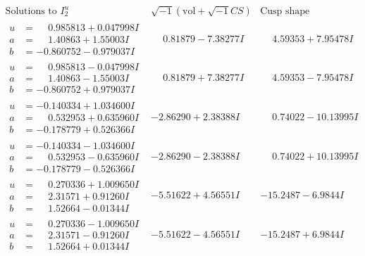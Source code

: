 \documentclass[1p]{elsarticle_modified}
\theoremstyle{definition}
\newcommand{\I}{\sqrt{-1}}
\begin{document}
$$\begin{array}{c|c|c}  
\text{Solutions to }I^u_{2}& \I (\text{vol} + \sqrt{-1}CS) & \text{Cusp shape}\\
 \hline 
\begin{aligned}
u &= \phantom{-}0.985813 + 0.047998 I \\
a &= \phantom{-}1.40863 + 1.55003 I \\
b &= -0.860752 - 0.979037 I\end{aligned}
 & \phantom{-}0.81879 - 7.38277 I & \phantom{-}4.59353 + 7.95478 I \\ \hline\begin{aligned}
u &= \phantom{-}0.985813 - 0.047998 I \\
a &= \phantom{-}1.40863 - 1.55003 I \\
b &= -0.860752 + 0.979037 I\end{aligned}
 & \phantom{-}0.81879 + 7.38277 I & \phantom{-}4.59353 - 7.95478 I \\ \hline\begin{aligned}
u &= -0.140334 + 1.034600 I \\
a &= \phantom{-}0.532953 + 0.635960 I \\
b &= -0.178779 + 0.526366 I\end{aligned}
 & -2.86290 + 2.38388 I & \phantom{-}0.74022 - 10.13995 I \\ \hline\begin{aligned}
u &= -0.140334 - 1.034600 I \\
a &= \phantom{-}0.532953 - 0.635960 I \\
b &= -0.178779 - 0.526366 I\end{aligned}
 & -2.86290 - 2.38388 I & \phantom{-}0.74022 + 10.13995 I \\ \hline\begin{aligned}
u &= \phantom{-}0.270336 + 1.009650 I \\
a &= \phantom{-}2.31571 + 0.91260 I \\
b &= \phantom{-}1.52664 - 0.01344 I\end{aligned}
 & -5.51622 + 4.56551 I & -15.2487 - 6.9844 I \\ \hline\begin{aligned}
u &= \phantom{-}0.270336 - 1.009650 I \\
a &= \phantom{-}2.31571 - 0.91260 I \\
b &= \phantom{-}1.52664 + 0.01344 I\end{aligned}
 & -5.51622 - 4.56551 I & -15.2487 + 6.9844 I \\ \hline\begin{aligned}

\end{aligned}
\end{array}$$
\end{document}
